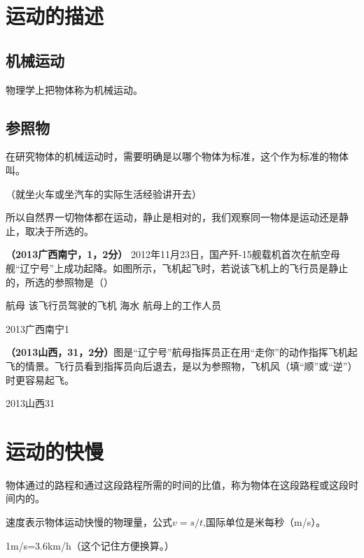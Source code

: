 \documentclass[12pt]{exam}%
\begin{document}
\begin{knowledge}
\section{运动的描述}
\subsection{机械运动}
物理学上把物体称为机械运动。


\subsection{参照物}
在研究物体的机械运动时，需要明确是以哪个物体为标准，这个作为标准的物体叫\answerline*[参照物]。

（就坐火车或坐汽车的实际生活经验讲开去）

所以自然界一切物体都在运动，静止是相对的，我们观察同一物体是运动还是静止，取决于所选的\answerline*[参照物]。


\textbf{（2013广西南宁，1，2分） } 2012年11月23日，国产歼-15舰载机首次在航空母舰“辽宁号”上成功起降。如图所示，飞机起飞时，若说该飞机上的飞行员是静止的，所选的参照物是（\answerline*[B]）

\begin{oneparchoices}
\choice 航母 
\choice 该飞行员驾驶的飞机
\choice 海水
\choice 航母上的工作人员
\end{oneparchoices}

\begin{linefig}[0.8]{2013广西南宁1}
\end{linefig}
\begin{multicols}{2}


\textbf{（2013山西，31，2分）}图是“辽宁号”航母指挥员正在用“走你”的动作指挥飞机起飞的情景。飞行员看到指挥员向后退去，是以\answerline*[飞机]为参照物，飞机\answerline*[逆]风（填“顺”或“逆”）时更容易起飞。
\columnbreak
\begin{linefig}{2013山西31}
\end{linefig}
\end{multicols}


\section{运动的快慢}
物体通过的路程和通过这段路程所需的时间的比值，称为物体在这段路程或这段时间内的\answerline*[速度]。

速度表示物体运动快慢的物理量，公式$v=s/t$,国际单位是米每秒（m/s）。

1m/s=3.6km/h（这个记住方便换算。）



\end{knowledge}
\end{document}
